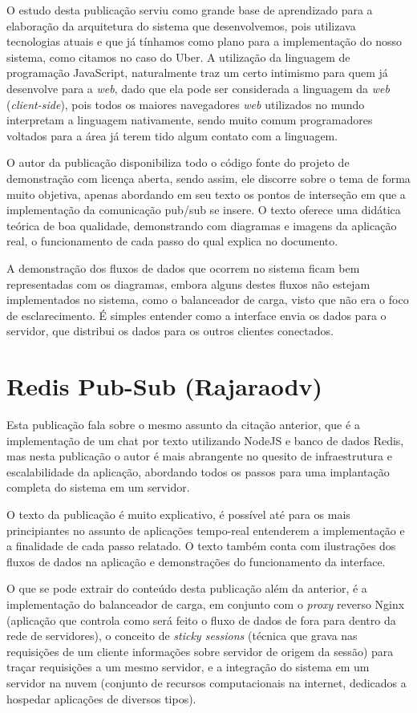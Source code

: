 O estudo desta publicação serviu como grande base de aprendizado para a elaboração da arquitetura do sistema que desenvolvemos, pois utilizava tecnologias atuais e que já tínhamos como plano para a implementação do nosso sistema, como citamos no caso do Uber. A utilização da linguagem de programação JavaScript, naturalmente traz um certo intimismo para quem já desenvolve para a \textit{web}, dado que ela pode ser considerada a linguagem da \textit{web} (\textit{client-side}), pois todos os maiores navegadores \textit{web} \cite{browsers-usage} utilizados no mundo interpretam a linguagem nativamente, sendo muito comum programadores voltados para a área já terem tido algum contato com a linguagem.

O autor da publicação disponibiliza todo o código fonte do projeto de demonstração com licença aberta, sendo assim, ele discorre sobre o tema de forma muito objetiva, apenas abordando em seu texto os pontos de interseção em que a implementação da comunicação pub/sub se insere. O texto oferece uma didática teórica de boa qualidade, demonstrando com diagramas e imagens da aplicação real, o funcionamento de cada passo do qual explica no documento.

A demonstração dos fluxos de dados que ocorrem no sistema ficam bem representadas com os diagramas, embora alguns destes fluxos não estejam implementados no sistema, como o balanceador de carga, visto que não era o foco de esclarecimento. É simples entender como a interface envia os dados para o servidor, que distribui os dados para os outros clientes conectados.

\section{Redis Pub-Sub (Rajaraodv)}
Esta publicação \cite{redis-pubsub-rajaraodv} fala sobre o mesmo assunto da citação anterior, que é a implementação de um chat por texto utilizando NodeJS e banco de dados Redis, mas nesta publicação o autor é mais abrangente no quesito de infraestrutura e escalabilidade da aplicação, abordando todos os passos para uma implantação completa do sistema em um servidor.

O texto da publicação é muito explicativo, é possível até para os mais principiantes no assunto de aplicações tempo-real entenderem a implementação e a finalidade de cada passo relatado. O texto também conta com ilustrações dos fluxos de dados na aplicação e demonstrações do funcionamento da interface.

O que se pode extrair do conteúdo desta publicação além da anterior, é a implementação do balanceador de carga, em conjunto com o \textit{proxy} reverso Nginx (aplicação que controla como será feito o fluxo de dados de fora para dentro da rede de servidores), o conceito de \textit{sticky sessions} (técnica que grava nas requisições de um cliente informações sobre servidor de origem da sessão) para traçar requisições a um mesmo servidor, e a integração do sistema em um servidor na nuvem (conjunto de recursos computacionais na internet, dedicados a hospedar aplicações de diversos tipos). 

